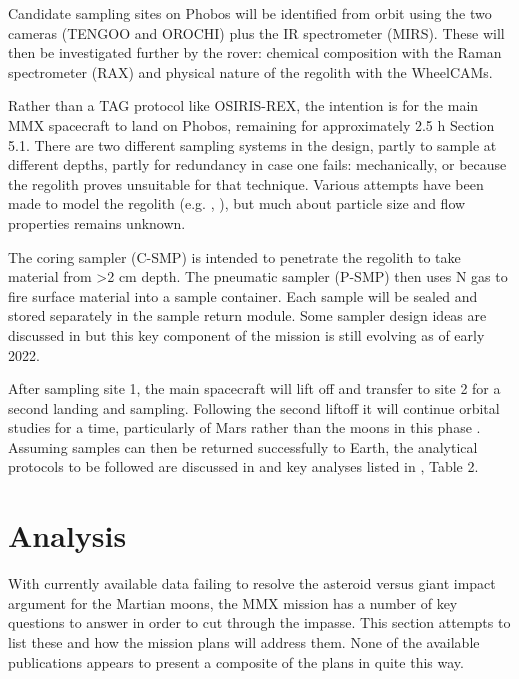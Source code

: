 Candidate sampling sites on Phobos will be identified from orbit using the two cameras (TENGOO and OROCHI) plus the IR spectrometer (MIRS). These will then be investigated further by the rover: chemical composition with the Raman spectrometer (RAX) and physical nature of the regolith with the WheelCAMs.

Rather than a TAG protocol like OSIRIS-REX, the intention is for the main MMX spacecraft to land on Phobos, remaining for approximately 2.5 h \citep{kawakatsu_preliminary_2022}{ Section 5.1}. There are two different sampling systems in the design, partly to sample at different depths, partly for redundancy in case one fails: mechanically, or because the regolith proves unsuitable for that technique. Various attempts have been made to model the regolith (e.g. \citet{miyamoto_surface_2021}, \citet{sunday_influence_2022}), but much about particle size and flow properties remains unknown.

The coring sampler (C-SMP) is intended to penetrate the regolith to take material from >2 cm depth. The pneumatic sampler (P-SMP) then uses N gas to fire surface material into a sample container. Each sample will be sealed and stored separately in the sample return module. Some sampler design ideas are discussed in \citet{kawakatsu_preliminary_2022} but this key component of the mission is still evolving as of early 2022.

After sampling site 1, the main spacecraft will lift off and transfer to site 2 for a second landing and sampling. Following the second liftoff it will continue orbital studies for a time, particularly of Mars rather than the moons in this phase \citep{ogohara_mars_2022}. Assuming samples can then be returned successfully to Earth, the analytical protocols to be followed are discussed in \citet{fujiya_analytical_2021} and key analyses listed in \citet{usui_importance_2020}, Table 2.

\section{Analysis}\label{section:abalysis}

With currently available data failing to resolve the asteroid versus giant impact argument for the Martian moons, the MMX mission has a number of key questions to answer in order to cut through the impasse. This section attempts to list these and how the mission plans will address them. None of the available publications appears to present a composite of the plans in quite this way.

